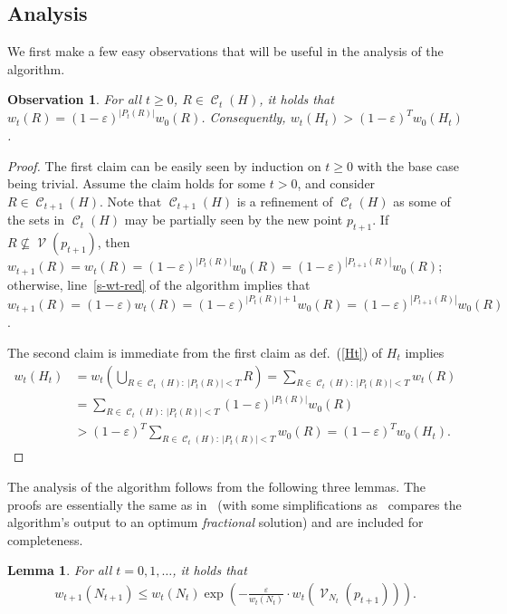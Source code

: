 \documentclass[a4paper,11pt]{article}
\newtheorem{lemma}[theorem]{Lemma}
\def\cC{\mathcal C}
\def\cV{\mathcal V}
\def\eps{\varepsilon}
\newcommand{\raf}[1]{(\ref{#1})}
\newcommand{\cells}{\operatorname{\cC}}
\newcommand{\Vis}{\operatorname{\cV}}
\newtheorem{observation}{Observation}
\begin{document}
\subsection{Analysis}\label{sec:analysis}
We first make a few easy observations that will be useful in the analysis of the algorithm.

\begin{observation}\label{ob1}
	For all $t\ge 0$, $R\in\cells_t(H)$, it holds that $w_t(R)=(1-\eps)^{|P_t(R)|}w_0(R)$. Consequently, $w_t(H_t)>(1-\eps)^Tw_0(H_t)$.
\end{observation}
\begin{proof}
	The first claim can be easily seen by induction on $t\ge0$ with the base case being trivial. Assume the claim holds for some $t>0$, and consider $R\in\cells_{t+1}(H)$. Note that $\cells_{t+1}(H)$ is a refinement of  $\cells_t(H)$ as some of the sets in $\cells_t(H)$ may be partially seen by the new point $p_{t+1}$. If $R\not\subseteq \Vis(p_{t+1})$, then $w_{t+1}(R)=w_t(R)=(1-\eps)^{|P_t(R)|}w_0(R)=(1-\eps)^{|P_{t+1}(R)|}w_0(R)$; otherwise, line~\ref{s-wt-red} of the algorithm implies that $w_{t+1}(R)=(1-\eps)w_t(R)=(1-\eps)^{|P_{t}(R)|+1}w_0(R)=(1-\eps)^{|P_{t+1}(R)|}w_0(R)$.
	
	The second claim is immediate from the first claim as def.~\raf{Ht} of $H_t$ implies
	\begin{align*}
	w_t(H_t)&=w_t\left(\bigcup_{R\in\cells_t(H):~|P_t(R)|<T}R\right)= \sum_{R\in \cells_t(H):~|P_t(R)|<T}w_t(R)\\&=\sum_{R\in\cells_t(H):~|P_t(R)|<T}(1-\eps)^{|P_t(R)|}w_0(R)\\&>(1-\eps)^T\sum_{R\in\cells_t(H) :~|P_t(R)|<T}w_0(R)=(1-\eps)^Tw_0(H_t).
	\end{align*}
\end{proof}


The analysis of the algorithm follows from the following three lemmas. The proofs are essentially the same as in~\cite{E23} (with some simplifications as~\cite{E23} compares the algorithm's output to an optimum {\it fractional} solution) and are included for completeness.
\iffalse
\begin{lemma} \label{l1} For all $t=0,1,\ldots$, it holds that
	\begin{align}
	w_{t+1}(N_{t+1}) \leq w_t(N_t) \exp\left(-\frac{\eps}{w_t(N_t)}\cdot w_t(\Vis_{N_t}(p_{t+1}))\right). \label{eq3}
	\end{align}
\end{lemma}
\end{document}
